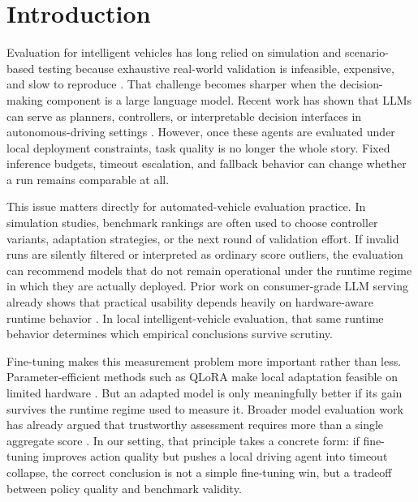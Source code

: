 \section{Introduction}

Evaluation for intelligent vehicles has long relied on simulation and scenario-based testing because exhaustive real-world validation is infeasible, expensive, and slow to reproduce \cite{riedmaier2020scenario}. That challenge becomes sharper when the decision-making component is a large language model. Recent work has shown that LLMs can serve as planners, controllers, or interpretable decision interfaces in autonomous-driving settings \cite{wen2023dilu,sha2023languagempc,fu2023drivelikehuman,xu2023drivegpt4}. However, once these agents are evaluated under local deployment constraints, task quality is no longer the whole story. Fixed inference budgets, timeout escalation, and fallback behavior can change whether a run remains comparable at all.

This issue matters directly for automated-vehicle evaluation practice. In simulation studies, benchmark rankings are often used to choose controller variants, adaptation strategies, or the next round of validation effort. If invalid runs are silently filtered or interpreted as ordinary score outliers, the evaluation can recommend models that do not remain operational under the runtime regime in which they are actually deployed. Prior work on consumer-grade LLM serving already shows that practical usability depends heavily on hardware-aware runtime behavior \cite{song2023powerinfer}. In local intelligent-vehicle evaluation, that same runtime behavior determines which empirical conclusions survive scrutiny.

Fine-tuning makes this measurement problem more important rather than less. Parameter-efficient methods such as QLoRA make local adaptation feasible on limited hardware \cite{dettmers2023qlora}. But an adapted model is only meaningfully better if its gain survives the runtime regime used to measure it. Broader model evaluation work has already argued that trustworthy assessment requires more than a single aggregate score \cite{liang2022helm}. In our setting, that principle takes a concrete form: if fine-tuning improves action quality but pushes a local driving agent into timeout collapse, the correct conclusion is not a simple fine-tuning win, but a tradeoff between policy quality and benchmark validity.

